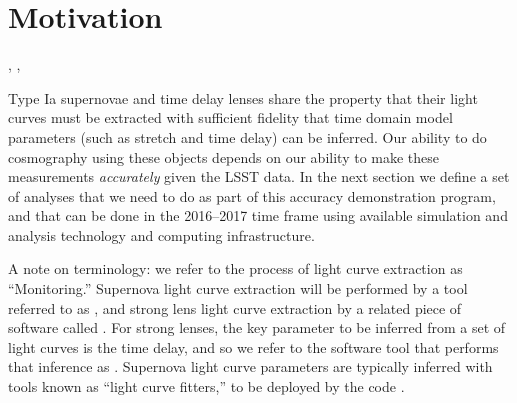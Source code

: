 \section{Motivation}
\def\secname{\chpname:motivation}
\label{\secname}

,
,

Type Ia supernovae and time delay lenses share the property that their
light curves must be extracted with sufficient fidelity that time
domain model parameters (such as stretch and time delay) can be
inferred. Our ability to do cosmography using these objects depends on
our ability to make these measurements {\it accurately} given the LSST
data. In the next section we define a set of analyses that we need to do
as part of this accuracy demonstration program, and that can be done
in the 2016--2017 time frame using available simulation and analysis
technology and computing infrastructure.

A note on terminology: we refer to the process of light curve
extraction as ``Monitoring.'' Supernova light curve extraction will be
performed by a  tool referred to as \SNMonitor, and strong lens light
curve extraction  by a related piece of software called \SLMonitor.
For strong lenses, the key parameter to be inferred  from a set of
light curves is the time delay, and so we refer to the software tool
that  performs that inference as \SLTimer. Supernova light curve
parameters  are typically inferred with tools known as
``light curve fitters,'' to be deployed by the code \SNDistance.



